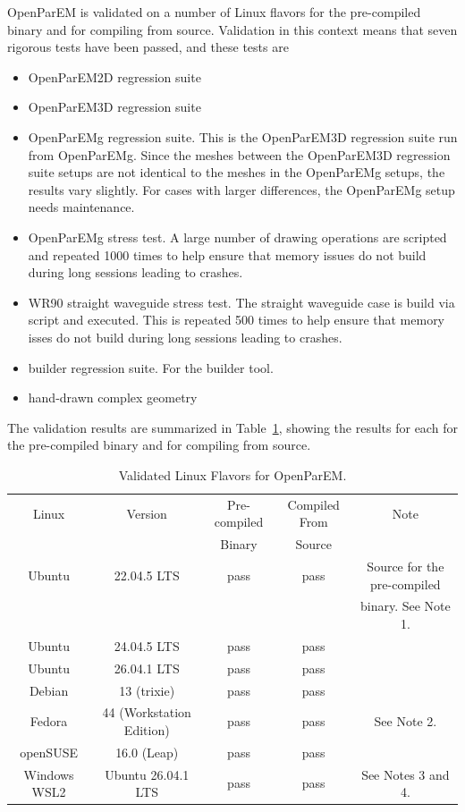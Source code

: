 \documentclass[titlepage]{article}
\renewcommand\_{\textunderscore\linebreak[1]}
\begin{document}
OpenParEM is validated on a number of Linux flavors for the pre-compiled binary and for compiling from source. Validation in this context means that seven rigorous tests have been passed, and these tests are

\begin{itemize}[nosep]
   \item OpenParEM2D regression suite
   \item OpenParEM3D regression suite
   \item OpenParEMg regression suite.  This is the OpenParEM3D regression suite run from OpenParEMg.  Since the meshes between the OpenParEM3D regression suite setups are not identical to the meshes in the OpenParEMg setups, the results vary slightly.  For cases with larger differences, the OpenParEMg setup needs maintenance.
   \item OpenParEMg stress test.  A large number of drawing operations are scripted and repeated 1000 times to help ensure that memory issues do not build during long sessions leading to crashes.
   \item WR90 straight waveguide stress test.  The straight waveguide case is build via script and executed.  This is repeated 500 times to help ensure that memory isses do not build during long sessions leading to crashes.
   \item builder regression suite.  For the builder tool.
   \item hand-drawn complex geometry
\end{itemize}

\noindent The validation results are summarized in Table~\ref{table:validatedLinux}, showing the results for each for the pre-compiled binary and for compiling from source.

\begin{table}[H]
\small
\caption{Validated Linux Flavors for OpenParEM.}
\begin{center}
\begin{tabular}{|c|c|c|c|c|}
\hline
Linux & Version & Pre-compiled & Compiled From & Note \\
      &         & Binary       & Source        &      \\
\hline
Ubuntu & 22.04.5 LTS & pass & pass & Source for the pre-compiled \\
       &             &      &      & binary. See Note 1. \\
Ubuntu & 24.04.5 LTS & pass & pass & \\
Ubuntu & 26.04.1 LTS & pass & pass & \\
Debian & 13 (trixie) & pass & pass & \\
Fedora & 44 (Workstation Edition) & pass & pass & See Note 2. \\
openSUSE & 16.0 (Leap) & pass & pass & \\
Windows WSL2 & Ubuntu 26.04.1 LTS & pass & pass & See Notes 3 and 4.\\
\hline
\end{tabular}
\end{center}
\label{table:validatedLinux}
\end{table}
\end{document}
